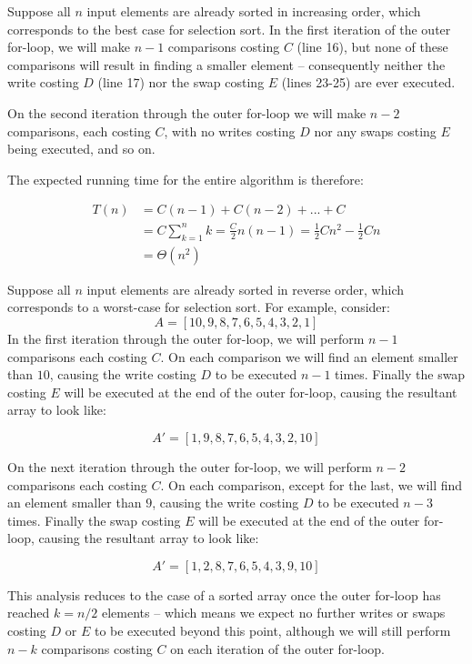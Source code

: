 \documentclass[a4paper,12pt]{article}
\begin{document}
Suppose all $n$ input elements are already sorted in increasing order, which corresponds to the 
best case for selection sort. In the first iteration of the 
outer for-loop, we will make $n-1$ comparisons costing $C$ (line 16), but none of these comparisons will 
result in finding a smaller element -- consequently neither the write costing $D$ (line 17) nor
the swap costing $E$ (lines 23-25) are ever executed.

On the second iteration through the outer for-loop we will make $n-2$ comparisons, each costing $C$, 
with no writes costing $D$ nor any swaps costing $E$ being executed, and so on.

The expected running time for the entire algorithm is therefore:

\begin{equation}
\begin{split}
T(n) & = C(n-1) + C(n-2) + ... + C \\
 & = C \sum_{k=1}^n k = \frac{C}{2}n(n-1) = \frac{1}{2}Cn^2 - \frac{1}{2}Cn  \\
 & = \Theta(n^2)
\end{split}
\end{equation}

Suppose all $n$ input elements are already sorted in reverse order, which corresponds to a worst-case
for selection sort. 
For example, consider:
\[A = [10, 9, 8, 7, 6, 5, 4, 3, 2, 1] \] 
In the first iteration through the outer for-loop, we will perform $n-1$ comparisons each costing $C$. On each 
comparison we will find an element smaller than $10$, causing the write costing $D$ to be executed 
$n-1$ times. Finally the swap costing $E$ will be executed at the end of the outer for-loop, 
causing the resultant array to look like:

\[ A' = [1, 9, 8, 7, 6, 5, 4, 3, 2, 10] \]

On the next iteration through the outer for-loop, we will perform $n-2$ comparisons each costing $C$. On each
comparison, except for the last, we will find an element smaller than $9$, causing the write costing $D$ to be 
executed $n-3$ times. Finally the swap costing $E$ will be executed at the end of the outer for-loop, 
causing the resultant array to look like:

\[ A' = [1, 2, 8, 7, 6, 5, 4, 3, 9, 10] \]

This analysis reduces to the case of a sorted array once the outer for-loop has reached $k=n/2$ elements -- 
which means we expect no further writes or swaps costing $D$ or $E$ to be executed beyond this point, although 
we will still perform $n-k$ comparisons costing $C$ on each iteration of the outer for-loop.
\end{document}
